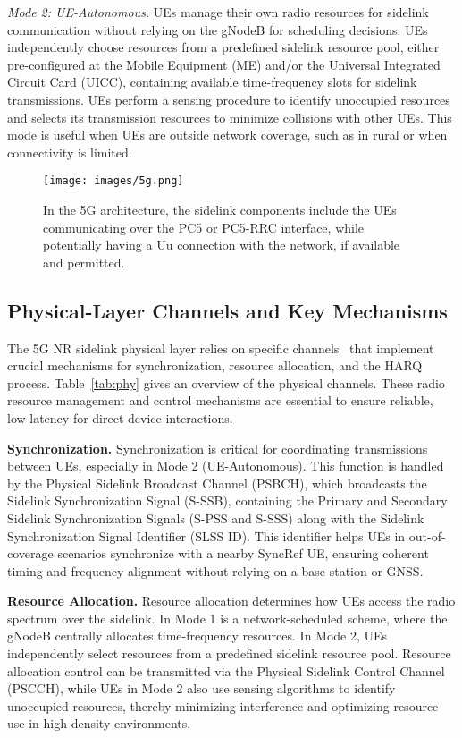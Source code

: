 \emph{Mode 2: UE-Autonomous.} UEs manage their own radio resources for sidelink communication without relying on the gNodeB for scheduling decisions. UEs independently choose resources from a predefined sidelink resource pool, either pre-configured at the Mobile Equipment (ME) and/or the Universal Integrated Circuit Card (UICC), containing available time-frequency slots for sidelink transmissions. UEs perform a sensing procedure to identify unoccupied resources and selects its transmission resources to minimize collisions with other UEs. This mode is useful when UEs are outside network coverage, such as in rural or when connectivity is limited.

\begin{figure}[!t]
     \centering
     \texttt{[image: images/5g.png]}
     \caption{In the 5G architecture, the sidelink components include the UEs communicating over the PC5 or PC5-RRC interface, while potentially having a Uu connection with the network, if available and permitted.}
     \label{fig:architecture}
\end{figure}

\subsection{Physical-Layer Channels and Key Mechanisms}

The 5G NR sidelink physical layer relies on specific channels~\cite{3gpp.38.211, 3gpp.38.212, 3gpp.38.213, 3gpp.38.214, 3gpp.37.985, 3gpp.38.133, 3gpp.38.331} that implement crucial mechanisms for synchronization, resource allocation, and the HARQ process. Table~\ref{tab:phy} gives an overview of the physical channels. These radio resource management and control mechanisms are essential to ensure reliable, low-latency for direct device interactions.

\textbf{Synchronization.} Synchronization is critical for coordinating transmissions between UEs, especially in Mode 2 (UE-Autonomous). This function is handled by the Physical Sidelink Broadcast Channel (PSBCH), which broadcasts the Sidelink Synchronization Signal (S-SSB), containing the Primary and Secondary Sidelink Synchronization Signals (S-PSS and S-SSS) along with the Sidelink Synchronization Signal Identifier (SLSS ID). This identifier helps UEs in out-of-coverage scenarios synchronize with a nearby SyncRef UE, ensuring coherent timing and frequency alignment without relying on a base station or GNSS.

\textbf{Resource Allocation.} Resource allocation determines how UEs access the radio spectrum over the sidelink. In Mode 1 is a network-scheduled scheme, where the gNodeB centrally allocates time-frequency resources. In Mode 2, UEs independently select resources from a predefined sidelink resource pool. Resource allocation control can be transmitted via the Physical Sidelink Control Channel (PSCCH), while UEs in Mode 2 also use sensing algorithms to identify unoccupied resources, thereby minimizing interference and optimizing resource use in high-density environments.

